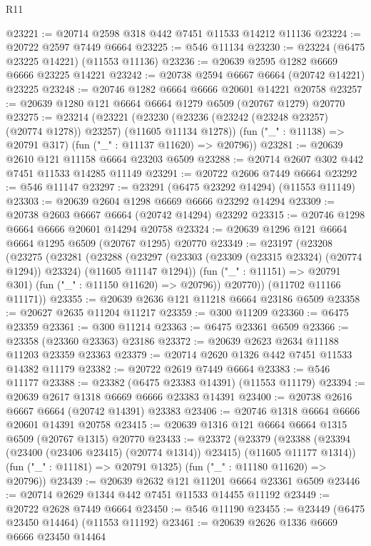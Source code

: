 \begin{lexlean}{R11}
\begin{coremodule}
{{{{{{{{{{{{{{{{{{{{{{{{{{{{{{{{{{{{{{{{{{{{{{{{{{{{{{{{{{{{{{{{{{{{{{{{{{{{{{{{{{@23221 := @20714 @2598 @318 @442 @7451 @11533 @14212 @11136
@23224 := @20722 @2597 @7449 @6664
@23225 := @546 @11134
@23230 := @23224 (@6475 @23225 @14221) (@11553 @11136)
@23236 := @20639 @2595 @1282 @6669 @6666 @23225 @14221
@23242 := @20738 @2594 @6667 @6664 (@20742 @14221) @23225
@23248 := @20746 @1282 @6664 @6666 @20601 @14221 @20758
@23257 := @20639 @1280 @121 @6664 @6664 @1279 @6509 (@20767 @1279) @20770
@23275 := @23214
    (@23221
      (@23230 (@23236 (@23242 (@23248 @23257) (@20774 @1278)) @23257) (@11605 @11134 @1278))
      (fun ("_" : @11138) => @20791 @317)
      (fun ("_" : @11137 @11620) => @20796))
@23281 := @20639 @2610 @121 @11158 @6664 @23203 @6509
@23288 := @20714 @2607 @302 @442 @7451 @11533 @14285 @11149
@23291 := @20722 @2606 @7449 @6664
@23292 := @546 @11147
@23297 := @23291 (@6475 @23292 @14294) (@11553 @11149)
@23303 := @20639 @2604 @1298 @6669 @6666 @23292 @14294
@23309 := @20738 @2603 @6667 @6664 (@20742 @14294) @23292
@23315 := @20746 @1298 @6664 @6666 @20601 @14294 @20758
@23324 := @20639 @1296 @121 @6664 @6664 @1295 @6509 (@20767 @1295) @20770
@23349 := @23197
    (@23208
      (@23275
        (@23281
          (@23288
            (@23297 (@23303 (@23309 (@23315 @23324) (@20774 @1294)) @23324) (@11605 @11147 @1294))
            (fun ("_" : @11151) => @20791 @301)
            (fun ("_" : @11150 @11620) => @20796))
          @20770))
      (@11702 @11166 @11171))
@23355 := @20639 @2636 @121 @11218 @6664 @23186 @6509
@23358 := @20627 @2635 @11204 @11217
@23359 := @300 @11209
@23360 := @6475 @23359
@23361 := @300 @11214
@23363 := @6475 @23361 @6509
@23366 := @23358 (@23360 @23363) @23186
@23372 := @20639 @2623 @2634 @11188 @11203 @23359 @23363
@23379 := @20714 @2620 @1326 @442 @7451 @11533 @14382 @11179
@23382 := @20722 @2619 @7449 @6664
@23383 := @546 @11177
@23388 := @23382 (@6475 @23383 @14391) (@11553 @11179)
@23394 := @20639 @2617 @1318 @6669 @6666 @23383 @14391
@23400 := @20738 @2616 @6667 @6664 (@20742 @14391) @23383
@23406 := @20746 @1318 @6664 @6666 @20601 @14391 @20758
@23415 := @20639 @1316 @121 @6664 @6664 @1315 @6509 (@20767 @1315) @20770
@23433 := @23372
    (@23379
      (@23388 (@23394 (@23400 (@23406 @23415) (@20774 @1314)) @23415) (@11605 @11177 @1314))
      (fun ("_" : @11181) => @20791 @1325)
      (fun ("_" : @11180 @11620) => @20796))
@23439 := @20639 @2632 @121 @11201 @6664 @23361 @6509
@23446 := @20714 @2629 @1344 @442 @7451 @11533 @14455 @11192
@23449 := @20722 @2628 @7449 @6664
@23450 := @546 @11190
@23455 := @23449 (@6475 @23450 @14464) (@11553 @11192)
@23461 := @20639 @2626 @1336 @6669 @6666 @23450 @14464
}}}}}}}}}}}}}}}}}}}}}}}}}}}}}}}}}}}}}}}}}}}}}}}}}}}}}}}}}}}}}}}}}}}}}}}}}}}}}}}}}}
\end{coremodule}
\end{lexlean}
